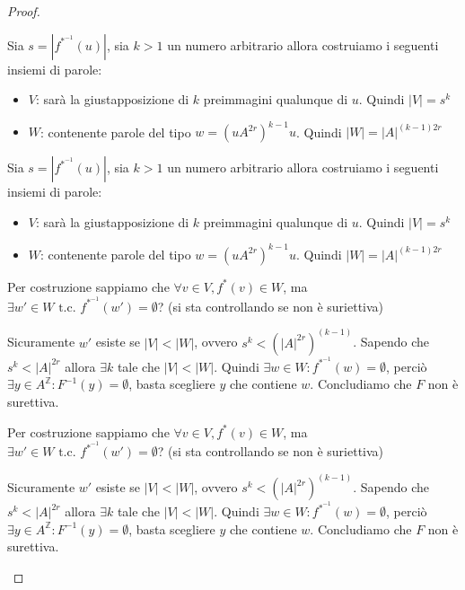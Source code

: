 \begin{teorema}
\begin{proof}
\begin{itemize}
                  Sia $s = |f^{\ast^{-1}}(u)|$, sia $k>1$ un numero arbitrario allora costruiamo
                  i seguenti insiemi di parole:
                  \begin{itemize}
                      \item $V$: sarà la giustapposizione di $k$ preimmagini qualunque
                            di $u$. Quindi $|V| = s^k$
                      \item $W$: contenente parole del tipo $w=(uA^{2r})^{k-1}u$. Quindi $|W| = |A|^{(k-1)2r}$
                  \end{itemize}
                  Sia $s = |f^{\ast^{-1}}(u)|$, sia $k>1$ un numero arbitrario allora costruiamo
                  i seguenti insiemi di parole:
                  \begin{itemize}
                      \item $V$: sarà la giustapposizione di $k$ preimmagini qualunque
                            di $u$. Quindi $|V| = s^k$
                      \item $W$: contenente parole del tipo $w=(uA^{2r})^{k-1}u$. Quindi $|W| = |A|^{(k-1)2r}$
                  \end{itemize}

                  Per costruzione sappiamo che $\forall v\in V, f^{\ast}(v)\in W$, ma $\exists
                      w'\in W\text{ t.c. } f^{\ast^{-1}} (w')= \emptyset$? (si sta controllando se non è suriettiva)

                  Sicuramente $w'$ esiste se $|V|<|W|$, ovvero  $s^k<(|A|^{2r})^{(k-1)}$.
                  Sapendo che $s^k < |A|^{2r}$ allora $\exists k$ tale che  $|V|<|W|$.
                  Quindi $\exists w \in W: f^{\ast^{-1}} (w) =\emptyset$, perciò
                  $\exists y \in A^{\mathbb{Z}}: F^{-1}(y) = \emptyset$, basta scegliere
                  $y$ che contiene $w$. Concludiamo che $F$ non è surettiva.

                  Per costruzione sappiamo che $\forall v\in V, f^{\ast}(v)\in W$, ma $\exists
                      w'\in W\text{ t.c. } f^{\ast^{-1}} (w')= \emptyset$? (si sta controllando se non è suriettiva)

                  Sicuramente $w'$ esiste se $|V|<|W|$, ovvero  $s^k<(|A|^{2r})^{(k-1)}$.
                  Sapendo che $s^k < |A|^{2r}$ allora $\exists k$ tale che  $|V|<|W|$.
                  Quindi $\exists w \in W: f^{\ast^{-1}} (w) =\emptyset$, perciò
                  $\exists y \in A^{\mathbb{Z}}: F^{-1}(y) = \emptyset$, basta scegliere
                  $y$ che contiene $w$. Concludiamo che $F$ non è surettiva.


\end{itemize}
\end{proof}
\end{teorema}
